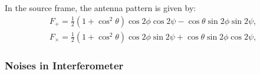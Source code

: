 \documentclass{ttuthes2007}
\begin{document}
In the source frame, the antenna pattern is given by:
\begin{align}
F_+=\frac{1}{2}(1+\cos^2\theta)\cos2\phi\cos2\psi-\cos\theta\sin2\phi\sin2\psi,\\
F_\times=\frac{1}{2}(1+\cos^2\theta)\cos2\phi\sin2\psi+\cos\theta\sin2\phi\cos2\psi,
\end{align}

\subsubsection{Noises in Interferometer}
\end{document}
